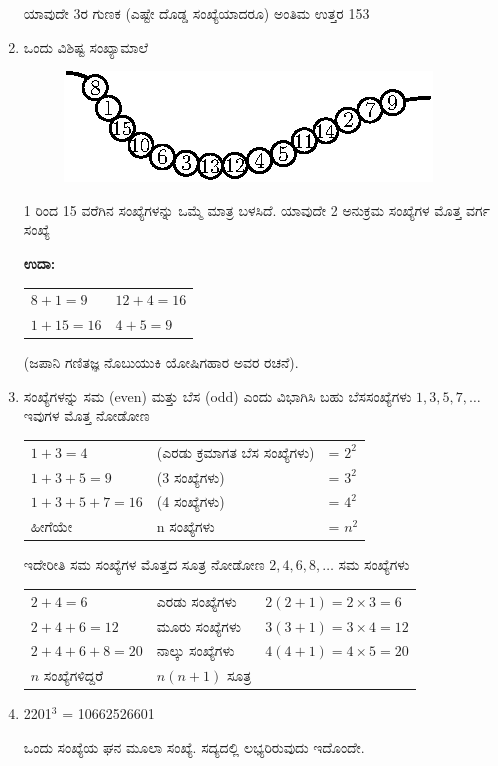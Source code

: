 \begin{enumerate}
ಯಾವುದೇ 3ರ ಗುಣಕ (ಎಷ್ಟೇ ದೊಡ್ಡ ಸಂಖ್ಯೆಯಾದರೂ) ಅಂತಿಮ ಉತ್ತರ 153

\item ಒಂದು ವಿಶಿಷ್ಟ ಸಂಖ್ಯಾಮಾಲೆ
\begin{figure}[H]
\centering
\includegraphics{images/chap1/q28.eps}
\end{figure}

1 ರಿಂದ 15 ವರೆಗಿನ ಸಂಖ್ಯೆಗಳನ್ನು ಒಮ್ಮೆ ಮಾತ್ರ ಬಳಸಿದೆ. ಯಾವುದೇ 2 ಅನುಕ್ರಮ ಸಂಖ್ಯೆಗಳ ಮೊತ್ತ ವರ್ಗ ಸಂಖ್ಯೆ

{\bf ಉದಾ:}
\begin{tabular}[t]{ll}
$8 + 1 = 9$ & $12 + 4 = 16$\\
$1 + 15 = 16$ & $4 + 5 = 9$
\end{tabular}

\hfill (ಜಪಾನಿ ಗಣಿತಜ್ಞ ನೊಬುಯುಕಿ ಯೋಷಿಗಹಾರ ಅವರ ರಚನೆ).

\item ಸಂಖ್ಯೆಗಳನ್ನು ಸಮ (even) ಮತ್ತು ಬೆಸ (odd) ಎಂದು ವಿಭಾಗಿಸಿ ಬಹು ಬೆಸ\break ಸಂಖ್ಯೆಗಳು $1, 3, 5, 7, \ldots$ ಇವುಗಳ ಮೊತ್ತ ನೋಡೋಣ

{\fontsize{11pt}{13pt}\selectfont
\begin{tabular}{lll}
$1 + 3 = 4$ &(ಎರಡು ಕ್ರಮಾಗತ ಬೆಸ ಸಂಖ್ಯೆಗಳು) & = $2^{2}$\\
$1 + 3 + 5 = 9$ &(3 ಸಂಖ್ಯೆಗಳು) & = $3^{2}$\\
$1 + 3 + 5 + 7 = 16$ &(4 ಸಂಖ್ಯೆಗಳು) & = $4^{2}$\\
ಹೀಗೆಯೇ & n ಸಂಖ್ಯೆಗಳು & = $n^{2}$
\end{tabular}}\relax

ಇದೇರೀತಿ ಸಮ ಸಂಖ್ಯೆಗಳ ಮೊತ್ತದ ಸೂತ್ರ ನೋಡೋಣ $2, 4, 6, 8, \ldots$ ಸಮ ಸಂಖ್ಯೆಗಳು

{\fontsize{11pt}{13pt}\selectfont
\begin{tabular}{lll}
$2 + 4= 6$ & ಎರಡು ಸಂಖ್ಯೆಗಳು & $2(2 + 1) = 2 \times 3 = 6$\\
$2 + 4 + 6 = 12$ & ಮೂರು ಸಂಖ್ಯೆಗಳು & $3(3 + 1) = 3 \times 4 = 12$\\
$2 + 4 + 6 + 8 = 20$ &ನಾಲ್ಕು ಸಂಖ್ಯೆಗಳು & $4(4 + 1) = 4 \times 5 = 20$\\
$n$ ಸಂಖ್ಯೆಗಳಿದ್ದರೆ & $n(n + 1)$ ಸೂತ್ರ &
\end{tabular}}\relax

\item 2201$^{3}$ = 10662526601

ಒಂದು ಸಂಖ್ಯೆಯ ಘನ ಮೂಲಾ ಸಂಖ್ಯೆ. ಸದ್ಯದಲ್ಲಿ ಲಭ್ಯರಿರುವುದು ಇದೊಂದೇ.
\end{enumerate}

